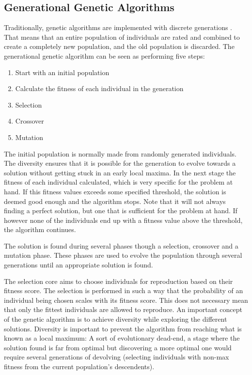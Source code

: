 \subsection{Generational Genetic Algorithms} 
Traditionally, genetic algorithms are implemented with discrete generations . That means that an entire population of individuals are rated and combined to create a completely new population, and the old population is discarded. The generational genetic algorithm can be seen as performing five steps:


\begin{enumerate}
    \item Start with an initial population
    \item Calculate the fitness of each individual in the generation
    \item Selection
    \item Crossover
    \item Mutation  
\end{enumerate}

The initial population is normally made from randomly generated individuals.
The diversity ensures that it is possible for the generation to evolve towards a solution without getting stuck in an early local maxima.
In the next stage the fitness of each individual calculated, which is very specific for the problem at hand.
If this fitness values exceeds some specified threshold, the solution is deemed good enough and the algorithm stops.
Note that it will not always finding a perfect solution, but one that is sufficient for the problem at hand.
If however none of the individuals end up with a fitness value above the threshold, the algorithm continues.

The solution is found during several phases though a selection, crossover and a mutation phase. 
These phases are used to evolve the population through several generations until an appropriate solution is found. 

The selection core aims to choose individuals for reproduction based on their fitness score.
The selection is performed in such a way that the probability of an individual being chosen scales with its fitness score.
This does not necessary mean that only the fittest individuals are allowed to reproduce.
An important concept of the genetic algorithm is to achieve diversity while exploring the different solutions.
Diversity is important to prevent the algorithm from reaching what is known as a local maximum:
A sort of evolutionary dead-end, a stage where the solution found is far from optimal but discovering a more optimal one would require several generations of devolving (selecting individuals with non-max fitness from the current population's descendents).

